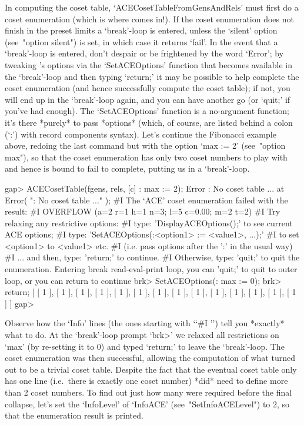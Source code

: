 In computing  the  coset  table,  `ACECosetTableFromGensAndRels'  must
first do a coset enumeration (which is where {\ACE} comes in!). If the
coset  enumeration  does  not  finish   in   the   preset   limits   a
`break'-loop{\undoquotes{}}        is
entered, unless the `silent' option (see~"option silent") is  set,  in
which case it returns `fail'. In the  event  that  a  `break'-loop  is
entered, don't despair or  be  frightened  by  the  word  `Error';  by
tweaking  {\ACE}'s  options  via  the  `SetACEOptions'  function  that
becomes available in the `break'-loop and then typing `return;' it may
be possible to help {\ACE} complete the coset enumeration  (and  hence
successfully compute the coset table); if not, you will end up in  the
`break'-loop again, and you can have another go (or `quit;' if  you've
had enough). The `SetACEOptions' function is a  no-argument  function;
it's there *purely* to pass *options* (which, of  course,  are  listed
behind a colon (`:') with record components  syntax).  Let's  continue
the Fibonacci example above, redoing the last  command  but  with  the
option `max := 2' (see~"option max"), so that  the  coset  enumeration
has only two coset numbers to play with and hence is bound to fail  to
complete, putting us in a `break'-loop.

\beginexample
gap> ACECosetTable(fgens, rels, [c] : max := 2);
Error : No coset table ... at
Error( ": No coset table ..." );
#I  The `ACE' coset enumeration failed with the result:
#I  OVERFLOW (a=2 r=1 h=1 n=3; l=5 c=0.00; m=2 t=2)
#I  Try relaxing any restrictive options:
#I  type: 'DisplayACEOptions();' to see current ACE options;
#I  type: 'SetACEOptions(:<option1> := <value1>, ...);'
#I  to set <option1> to <value1> etc.
#I  (i.e. pass options after the ':' in the usual way)
#I  ... and then, type: 'return;' to continue.
#I  Otherwise, type: 'quit;' to quit the enumeration.
Entering break read-eval-print loop, you can 'quit;' to quit to outer loop,
or you can return to continue
brk> SetACEOptions(: max := 0);
brk> return;
[ [ 1 ], [ 1 ], [ 1 ], [ 1 ], [ 1 ], [ 1 ], [ 1 ], [ 1 ], [ 1 ], [ 1 ], 
  [ 1 ], [ 1 ], [ 1 ], [ 1 ] ]
gap>
\endexample

Observe how the `Info' lines (the  ones  starting  with  \lq{}`\#I '')
tell you *exactly* what to do. At the `break'-loop  prompt  `brk>'  we
relaxed all restrictions on `max' (by re-setting it to  0)  and  typed
`return;' to leave the `break'-loop. The coset  enumeration  was  then
successful, allowing the computation  of  what  turned  out  to  be  a
trivial coset table. Despite the fact that the  eventual  coset  table
only has one line (i.e.~there is  exactly  one  coset  number)  {\ACE}
*did* need to define more than 2 coset numbers. To find out  just  how
many  were  required  before  the  final  collapse,  let's   set   the
`InfoLevel' of `InfoACE' (see~"SetInfoACELevel") to  2,  so  that  the
{\ACE} enumeration result is printed.

